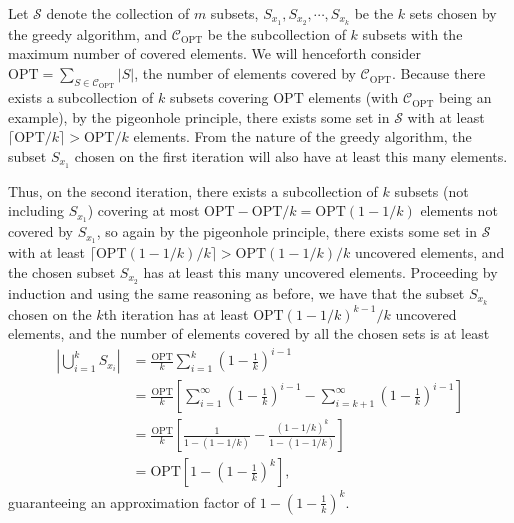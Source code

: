 \documentclass[a4paper,11pt]{article}
\begin{document}
Let $\mathcal{S}$ denote the collection of $m$ subsets, $S_{x_1}, S_{x_2}, \cdots, S_{x_k}$ be the $k$ sets chosen by the greedy algorithm, and $\mathcal{C}_{\text{OPT}}$ be the subcollection of $k$ subsets with the maximum number of covered elements. We will henceforth consider $\text{OPT} = \sum_{S \in \mathcal{C}_{\text{OPT}}} |S|$, the number of elements covered by $\mathcal{C}_{\text{OPT}}$. Because there exists a subcollection of $k$ subsets covering $\text{OPT}$ elements (with $\mathcal{C}_{\text{OPT}}$ being an example), by the pigeonhole principle, there exists some set in $\mathcal{S}$ with at least $\lceil \text{OPT}/k \rceil > \text{OPT}/k$ elements. From the nature of the greedy algorithm, the subset $S_{x_1}$ chosen on the first iteration will also have at least this many elements. \par
Thus, on the second iteration, there exists a subcollection of $k$ subsets (not including $S_{x_1}$) covering at most $\text{OPT} - \text{OPT}/k = \text{OPT}(1 - 1/k)$ elements not covered by $S_{x_1}$, so again by the pigeonhole principle, there exists some set in $\mathcal{S}$ with at least $\lceil \text{OPT}(1 - 1/k)/k \rceil > \text{OPT}(1 - 1/k)/k$ uncovered elements, and the chosen subset $S_{x_2}$ has at least this many uncovered elements. Proceeding by induction and using the same reasoning as before, we have that the subset $S_{x_k}$ chosen on the $k$th iteration has at least $\text{OPT}(1 - 1/k)^{k - 1}/k$ uncovered elements, and the number of elements covered by all the chosen sets is at least
\begin{align*}
    \left| \bigcup_{i = 1}^k S_{x_i} \right| &= \frac{\text{OPT}}{k} \sum_{i = 1}^k \left( 1 - \frac{1}{k} \right)^{i - 1} \\
    &= \frac{\text{OPT}}{k} \left[ \sum_{i = 1}^\infty \left( 1 - \frac{1}{k} \right)^{i - 1} - \sum_{i = {k + 1}}^\infty \left( 1 - \frac{1}{k} \right)^{i - 1} \right] \\
    &= \frac{\text{OPT}}{k} \left[ \frac{1}{1 - (1 - 1/k)} - \frac{(1 - 1/k)^k}{1 - (1 - 1/k)} \right] \\
    &= \text{OPT} \left[ 1 - \left( 1 - \frac{1}{k} \right)^k \right],
\end{align*}
guaranteeing an approximation factor of $1 - \left( 1 - \frac{1}{k} \right)^k$.
\end{document}

